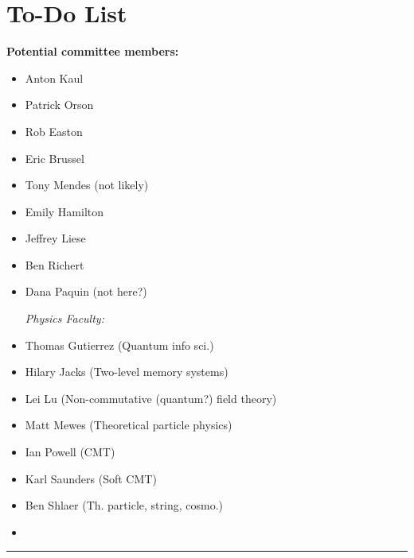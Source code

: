 \chapter{To-Do List}\label{ch:todo}

\textbf{Potential committee members:}
\begin{itemize}
    \item Anton Kaul
    \item Patrick Orson
    \item Rob Easton
    \item Eric Brussel
    \item Tony Mendes (not likely)
    \item Emily Hamilton
    \item Jeffrey Liese
    \item Ben Richert
    \item Dana Paquin (not here?)
    
    \textit{Physics Faculty:}
    \item Thomas Gutierrez (Quantum info sci.)
    \item Hilary Jacks (Two-level memory systems)
    \item Lei Lu (Non-commutative (quantum?) field theory)
    \item Matt Mewes (Theoretical particle physics)
    \item Ian Powell (CMT)
    \item Karl Saunders (Soft CMT)
    \item Ben Shlaer (Th. particle, string, cosmo.)
    \item 
\end{itemize}

\begin{center}\rule{.85\textwidth}{0.65pt}\end{center}

